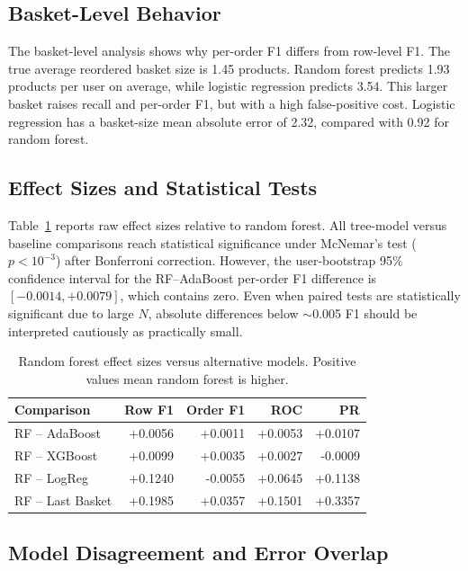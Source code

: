 \documentclass[10pt,twocolumn]{article}
\begin{document}
\subsection{Basket-Level Behavior}

The basket-level analysis shows why per-order F1 differs from row-level F1. The true average reordered basket size is 1.45 products. Random forest predicts 1.93 products per user on average, while logistic regression predicts 3.54. This larger basket raises recall and per-order F1, but with a high false-positive cost. Logistic regression has a basket-size mean absolute error of 2.32, compared with 0.92 for random forest.

\subsection{Effect Sizes and Statistical Tests}

Table~\ref{tab:effects} reports raw effect sizes relative to random forest. All tree-model versus baseline comparisons reach statistical significance under McNemar's test ($p < 10^{-3}$) after Bonferroni correction. However, the user-bootstrap 95\% confidence interval for the RF--AdaBoost per-order F1 difference is $[-0.0014, +0.0079]$, which contains zero. Even when paired tests are statistically significant due to large $N$, absolute differences below $\sim$0.005 F1 should be interpreted cautiously as practically small.

\begin{table}[t]
\centering
\caption{Random forest effect sizes versus alternative models. Positive values mean random forest is higher.}
\label{tab:effects}
\scriptsize
\begin{tabular}{lrrrr}
\toprule
Comparison & Row F1 & Order F1 & ROC & PR \\
\midrule
RF -- AdaBoost & +0.0056 & +0.0011 & +0.0053 & +0.0107 \\
RF -- XGBoost & +0.0099 & +0.0035 & +0.0027 & -0.0009 \\
RF -- LogReg & +0.1240 & -0.0055 & +0.0645 & +0.1138 \\
RF -- Last Basket & +0.1985 & +0.0357 & +0.1501 & +0.3357 \\
\bottomrule
\end{tabular}
\end{table}

\subsection{Model Disagreement and Error Overlap}
\end{document}
